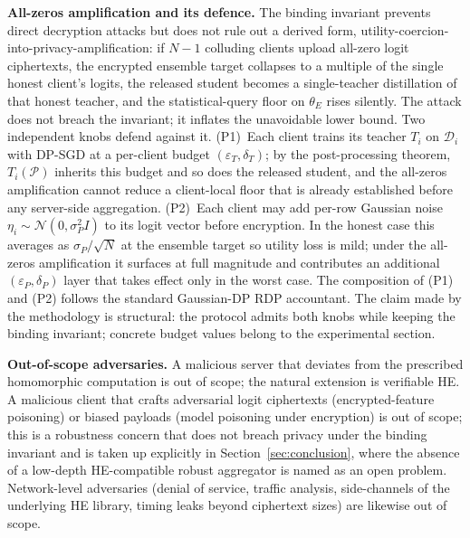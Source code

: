 \par\noindent\textbf{All-zeros amplification and its defence.} The binding invariant prevents direct decryption attacks but does not rule out a derived form, utility-coercion-into-privacy-amplification: if $N{-}1$ colluding clients upload all-zero logit ciphertexts, the encrypted ensemble target collapses to a multiple of the single honest client's logits, the released student becomes a single-teacher distillation of that honest teacher, and the statistical-query floor on $\theta_E$ rises silently. The attack does not breach the invariant; it inflates the unavoidable lower bound. Two independent knobs defend against it. (P1)~Each client trains its teacher $T_i$ on $\mathcal{D}_i$ with DP-SGD at a per-client budget $(\varepsilon_T, \delta_T)$; by the post-processing theorem, $T_i(\mathcal P)$ inherits this budget and so does the released student, and the all-zeros amplification cannot reduce a client-local floor that is already established before any server-side aggregation. (P2)~Each client may add per-row Gaussian noise $\eta_i \sim \mathcal N(0, \sigma_P^2 I)$ to its logit vector before encryption. In the honest case this averages as $\sigma_P/\sqrt N$ at the ensemble target so utility loss is mild; under the all-zeros amplification it surfaces at full magnitude and contributes an additional $(\varepsilon_P, \delta_P)$ layer that takes effect only in the worst case. The composition of (P1) and (P2) follows the standard Gaussian-DP RDP accountant. The claim made by the methodology is structural: the protocol admits both knobs while keeping the binding invariant; concrete budget values belong to the experimental section.

\par\noindent\textbf{Out-of-scope adversaries.} A malicious server that deviates from the prescribed homomorphic computation is out of scope; the natural extension is verifiable HE. A malicious client that crafts adversarial logit ciphertexts (encrypted-feature poisoning) or biased payloads (model poisoning under encryption) is out of scope; this is a robustness concern that does not breach privacy under the binding invariant and is taken up explicitly in Section~\ref{sec:conclusion}, where the absence of a low-depth HE-compatible robust aggregator is named as an open problem. Network-level adversaries (denial of service, traffic analysis, side-channels of the underlying HE library, timing leaks beyond ciphertext sizes) are likewise out of scope.


